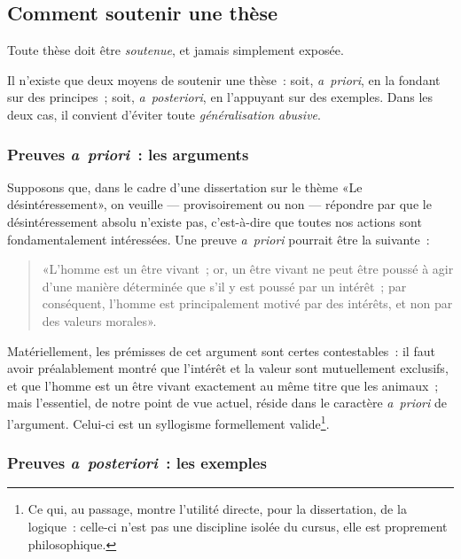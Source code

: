 \documentclass[a4paper,11pt]{article}
\newcommand{\cad}{c'est-à-dire}
\newcommand{\apr}{\emph{a~priori}}
\newcommand{\apost}{\emph{a~posteriori}}
\begin{document}
\subsection{Comment soutenir une thèse}

Toute thèse doit être \emph{soutenue}, et jamais simplement exposée.


\par

Il n'existe que deux moyens de soutenir une thèse~: soit, \apr{}, en la
fondant sur des principes~; soit, \apost{}, en l'appuyant sur des
exemples. Dans les deux cas, il convient d'éviter toute
\emph{généralisation abusive}.


\subsubsection{Preuves \apr{}~: les arguments}

Supposons que, dans le cadre d'une dissertation sur le thème «Le
désintéressement», on veuille --- provisoirement ou non --- répondre par
que le désintéressement absolu n'existe pas, \cad{} que toutes nos
actions sont fondamentalement intéressées. Une preuve \apr{} pourrait
être la suivante~:
\begin{quote}
  «L'homme est un être vivant~; or, un être vivant ne peut être poussé à
  agir d'une manière déterminée que s'il y est poussé par un intérêt~;
  par conséquent, l'homme est principalement motivé par des intérêts, et
  non par des valeurs morales».
\end{quote}
Matériellement, les prémisses de cet argument sont certes contestables~:
il faut avoir préalablement montré que l'intérêt et la valeur sont
mutuellement exclusifs, et que l'homme est un être vivant exactement au
même titre que les animaux~; mais l'essentiel, de notre point de vue
actuel, réside dans le caractère \apr{} de l'argument. Celui-ci est un
syllogisme formellement valide\footnote{Ce qui, au passage, montre
  l'utilité directe, pour la dissertation, de la logique~: celle-ci
  n'est pas une discipline isolée du cursus, elle est proprement
  philosophique.}.

\par


\subsubsection{Preuves \apost{}~: les exemples}
\end{document}
